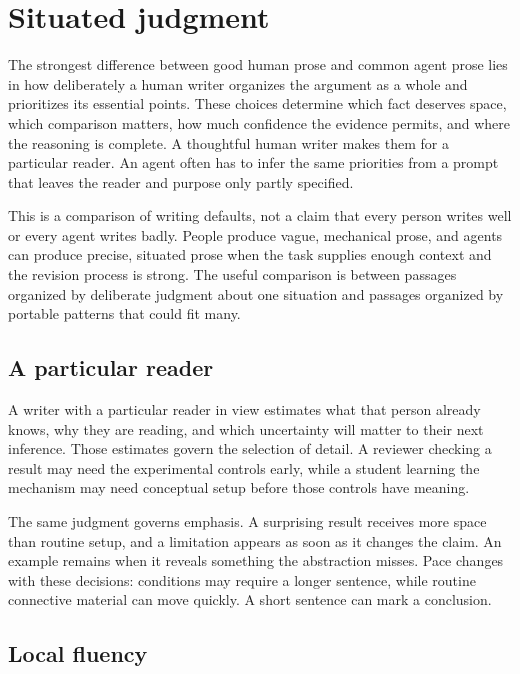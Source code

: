 \section{Situated judgment}
\label{sec:scope}

The strongest difference between good human prose and common agent prose lies
in how deliberately a human writer organizes the argument as a whole and
prioritizes its essential points. These choices determine which fact deserves
space, which comparison matters, how much confidence the evidence permits,
and where the reasoning is complete. A thoughtful human writer makes them for
a particular reader. An agent often has to infer the same priorities from a
prompt that leaves the reader and purpose only partly specified.

This is a comparison of writing defaults, not a claim that every person writes
well or every agent writes badly. People produce vague, mechanical prose, and
agents can produce precise, situated prose when the task supplies enough
context and the revision process is strong. The useful comparison is between
passages organized by deliberate judgment about one situation and passages
organized by portable patterns that could fit many.

\subsection{A particular reader}

A writer with a particular reader in view estimates what that person already
knows, why they are reading, and which uncertainty will matter to their next
inference. Those estimates govern the selection of detail. A reviewer checking
a result may need the experimental controls early, while a student learning
the mechanism may need conceptual setup before those controls have meaning.

The same judgment governs emphasis. A surprising result receives more space
than routine setup, and a limitation appears as soon as it changes the claim.
An example remains when it reveals something the abstraction misses. Pace
changes with these decisions: conditions may require a longer sentence, while
routine connective material can move quickly. A short sentence can mark a
conclusion.

\subsection{Local fluency}

